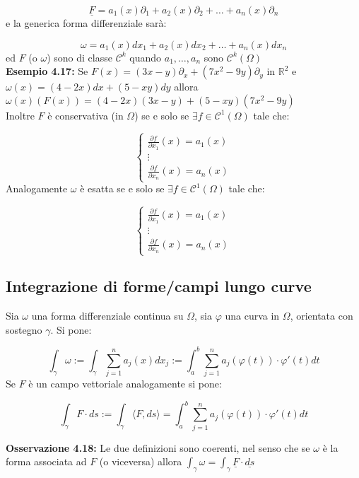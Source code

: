\documentclass[a4paper,11pt,titlepage]{book}
\begin{document}
$$\underline F=a_1(x)\partial_1+a_2(x)\partial_2+\ldots+a_n(x)\partial_n$$
e la generica forma differenziale sarà:

$$\omega=a_1(x)dx_1+a_2(x)dx_2+\ldots+a_n(x)dx_n$$
ed $F$ (o $\omega$) sono di classe $\mathcal{C}^k$ quando $a_1,\ldots,a_n$ sono $\mathcal{C}^k(\Omega)$\\

\textbf{Esempio 4.17: } Se $F(x)=(3x-y)\partial_x+(7x^2-9y)\partial_y$ in $\mathbb{R}^2$ e $\omega(x)=(4-2x)dx+(5-xy)dy$ allora $\omega(x)(F(x))=(4-2x)(3x-y)+(5-xy)(7x^2-9y)$\\

Inoltre $F$ è conservativa (in $\Omega$) se e solo se $\exists f \in \mathcal{C}^1(\Omega)$ tale che: 

$$\begin{cases}
\frac{\partial f}{\partial x_1}(x)=a_1(x)\\
\vdots\\
\frac{\partial f}{\partial x_n}(x)=a_n(x)
\end{cases}$$
Analogamente $\omega$ è esatta se e solo se $\exists f \in \mathcal{C}^1(\Omega)$ tale che: 

$$\begin{cases}
\frac{\partial f}{\partial x_1}(x)=a_1(x)\\
\vdots\\
\frac{\partial f}{\partial x_n}(x)=a_n(x)
\end{cases}$$

\subsection{Integrazione di forme/campi lungo curve}

Sia $\omega$ una forma differenziale continua su $\Omega$, sia $\varphi$ una curva in $\Omega$, orientata con sostegno $\gamma$. Si pone:

$$\int_\gamma\omega:=\int_\gamma \sum_{j=1}^na_j(x)dx_j:=\int_a^b\sum_{j=1}^n a_j(\varphi(t))\cdot\varphi'(t)dt$$
Se $F$ è un campo vettoriale analogamente si pone:

$$\int_\gamma F\cdot ds:=\int_\gamma \langle F,ds\rangle=\int_a^b\sum_{j=1}^n a_j(\varphi(t))\cdot\varphi'(t)dt$$

\textbf{Osservazione 4.18: }Le due definizioni sono coerenti, nel senso che se $\omega$ è la forma associata ad $F$ (o viceversa) allora $\int_\gamma \omega=\int_\gamma \underline{F}\cdot\underline{ds}$\\
\end{document}
